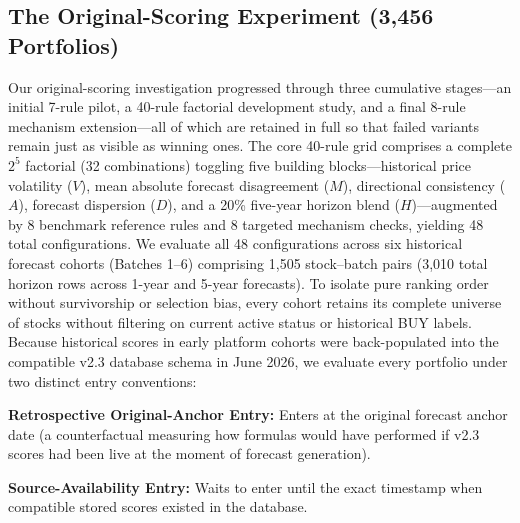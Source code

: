 \documentclass[11pt,a4paper]{article}
\numberwithin{table}{section}
\begin{document}
\subsection{The Original-Scoring Experiment (3,456 Portfolios)}

Our original-scoring investigation progressed through three cumulative stages---an initial 7-rule pilot, a 40-rule factorial development study, and a final 8-rule mechanism extension---all of which are retained in full so that failed variants remain just as visible as winning ones. The core 40-rule grid comprises a complete $2^5$ factorial (32 combinations) toggling five building blocks---historical price volatility ($V$), mean absolute forecast disagreement ($M$), directional consistency ($A$), forecast dispersion ($D$), and a 20\% five-year horizon blend ($H$)---augmented by 8 benchmark reference rules and 8 targeted mechanism checks, yielding 48 total configurations. We evaluate all 48 configurations across six historical forecast cohorts (Batches 1--6) comprising 1,505 stock--batch pairs (3,010 total horizon rows across 1-year and 5-year forecasts). To isolate pure ranking order without survivorship or selection bias, every cohort retains its complete universe of stocks without filtering on current active status or historical BUY labels. Because historical scores in early platform cohorts were back-populated into the compatible v2.3 database schema in June 2026, we evaluate every portfolio under two distinct entry conventions:

\textbf{Retrospective Original-Anchor Entry:}  Enters at the original forecast anchor date (a counterfactual measuring how formulas would have performed if v2.3 scores had been live at the moment of forecast generation).

\textbf{Source-Availability Entry:}  Waits to enter until the exact timestamp when compatible stored scores existed in the database.
\end{document}
